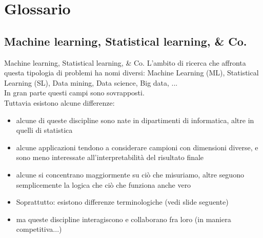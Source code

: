 \section[Glossario]{Glossario}


\subsection[Machine learning, Statistical learning, \& Co.]{Machine learning, Statistical learning, \& Co.}


\begin{frame}

	\begin{block}{Machine learning, Statistical learning, \& Co.}
		L'ambito di ricerca che affronta questa tipologia di problemi ha nomi diversi: Machine Learning (ML), Statistical Learning (SL), Data mining, Data science, Big data, ...\\
		In gran parte questi campi sono sovrapposti.\\
		Tuttavia esistono alcune differenze:
		\begin{itemize}
			\item alcune di queste discipline sono nate in dipartimenti di informatica, altre in quelli di statistica
			\item alcune applicazioni tendono a considerare campioni con dimensioni diverse, e sono meno interessate all'interpretabilità del risultato finale
			\item alcune si concentrano maggiormente su ciò che misuriamo, altre seguono semplicemente la logica che ciò che funziona anche vero
			\item Soprattutto: esistono differenze terminologiche (vedi slide seguente)
			\item ma queste discipline interagiscono e collaborano fra loro (in maniera competitiva...)
		\end{itemize}
	\end{block}

\end{frame}


